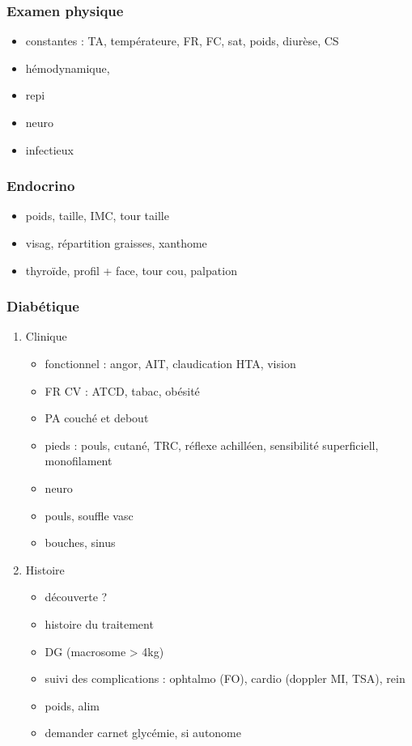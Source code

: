 \documentclass[11pt]{article}
\begin{document}
\subsubsection{Examen physique}
\label{sec:org6da65b5}
\begin{itemize}
\item constantes : TA, températeure, FR, FC, sat, poids, diurèse, CS
\item hémodynamique,
\item repi
\item neuro
\item infectieux
\end{itemize}
\subsubsection{Endocrino}
\label{sec:org69c11af}
\begin{itemize}
\item poids, taille, IMC, tour taille
\item visag, répartition graisses, xanthome
\item thyroïde, profil + face, tour cou, palpation
\end{itemize}
\subsubsection{Diabétique}
\label{sec:orga18b7cb}
\begin{enumerate}
\item Clinique
\label{sec:orgc90d60c}
\begin{itemize}
\item fonctionnel : angor, AIT, claudication HTA, vision
\item FR CV : ATCD, tabac, obésité
\item PA couché et debout
\item pieds : pouls, cutané, TRC, réflexe achilléen, sensibilité superficiell,
monofilament
\item neuro
\item pouls, souffle vasc
\item bouches, sinus
\end{itemize}
\item Histoire
\label{sec:org938596f}
\begin{itemize}
\item découverte ?
\item histoire du traitement
\item DG (macrosome > 4kg)
\item suivi des complications : ophtalmo (FO), cardio (doppler MI, TSA), rein
\item poids, alim
\item demander carnet glycémie, si autonome
\end{itemize}
\end{enumerate}
\end{document}
